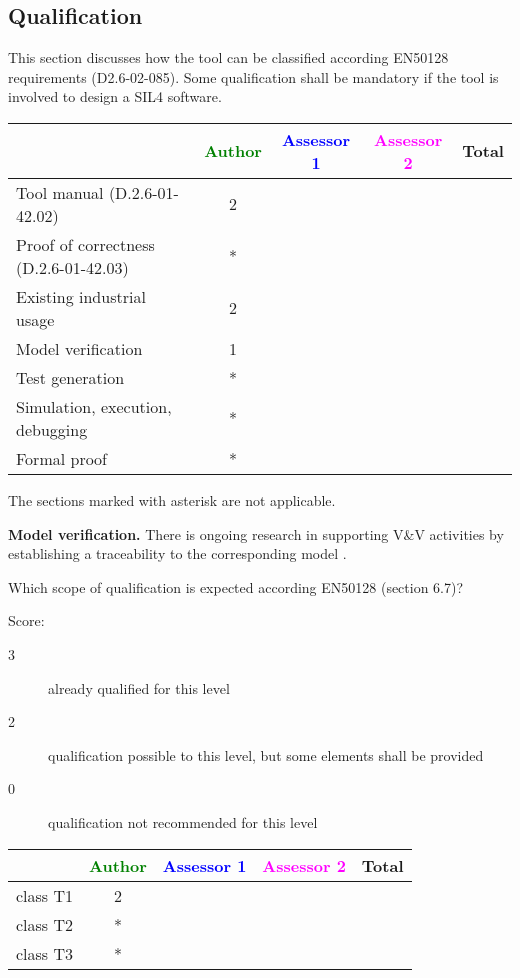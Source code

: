 \subsection{Qualification}

This section discusses how the tool can be classified according EN50128 requirements (D2.6-02-085). Some qualification shall be mandatory  if the tool is involved to design a SIL4 software.


\begin{tabular}{|l | c | c | c | c|}
\hline
& \textcolor{green}{Author} & \textcolor{blue}{Assessor 1} & \textcolor{magenta}{Assessor 2} & Total \\
\hline 
Tool manual (D.2.6-01-42.02) & 2 & & &  \\
\hline
Proof of correctness (D.2.6-01-42.03) & * & & & \\
\hline
Existing industrial  usage  & 2 & & & \\
\hline
Model verification & 1 & & & \\
\hline
Test generation & * & & & \\
\hline
Simulation, execution, debugging & * & & & \\
\hline
Formal proof & * & & & \\
\hline
\end{tabular}

\begin{author_comment}
The sections marked with asterisk are not applicable.

\textbf{Model verification.} There is ongoing research in supporting V\&V activities by establishing a traceability to the corresponding model \cite {HalJasLad2013}.

\end{author_comment}

Which scope of qualification is expected according EN50128 (section 6.7)?

Score:
\begin{description}
\item[3] already qualified for this level
\item[2] qualification possible to this level, but some elements shall be provided
\item[0] qualification not recommended for this level
\end{description}


\begin{tabular}{|l | c | c | c | c|}
\hline
& \textcolor{green}{Author} & \textcolor{blue}{Assessor 1} & \textcolor{magenta}{Assessor 2} & Total \\
\hline 
class T1 & 2 & & &  \\
\hline
class T2   & * & & & \\
\hline
class T3  & * & & & \\
\hline
\end{tabular}

